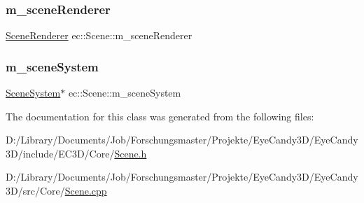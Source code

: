 \mbox{\label{classec_1_1_scene_a17a2c241cec6bda0a5895b353aa28fa7}} 
\subsubsection{\texorpdfstring{m\+\_\+scene\+Renderer}{m\_sceneRenderer}}
{\footnotesize\ttfamily \mbox{\hyperlink{classec_1_1_scene_renderer}{Scene\+Renderer}} ec\+::\+Scene\+::m\+\_\+scene\+Renderer\hspace{0.3cm}{\ttfamily [protected]}}

\mbox{\label{classec_1_1_scene_ad63e472baf8e283c596891384ea98aad}} 
\subsubsection{\texorpdfstring{m\+\_\+scene\+System}{m\_sceneSystem}}
{\footnotesize\ttfamily \mbox{\hyperlink{classec_1_1_scene_system}{Scene\+System}}$\ast$ ec\+::\+Scene\+::m\+\_\+scene\+System\hspace{0.3cm}{\ttfamily [protected]}}



The documentation for this class was generated from the following files\+:\begin{DoxyCompactItemize}
\item 
D\+:/\+Library/\+Documents/\+Job/\+Forschungsmaster/\+Projekte/\+Eye\+Candy3\+D/\+Eye\+Candy3\+D/include/\+E\+C3\+D/\+Core/\mbox{\hyperlink{_scene_8h}{Scene.\+h}}\item 
D\+:/\+Library/\+Documents/\+Job/\+Forschungsmaster/\+Projekte/\+Eye\+Candy3\+D/\+Eye\+Candy3\+D/src/\+Core/\mbox{\hyperlink{_scene_8cpp}{Scene.\+cpp}}\end{DoxyCompactItemize}
